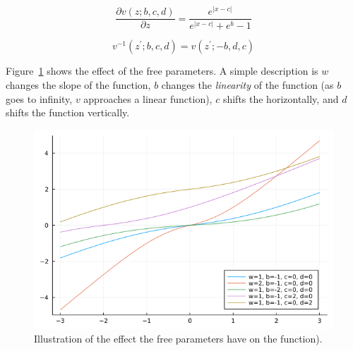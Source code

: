 \documentclass[twoside]{article}
\begin{document}
\begin{equation}
  \frac{\partial v(z; b, c, d)}{\partial z} = \frac{e^{\lvert x - c \rvert}}
  {e^{\lvert x - c \rvert} + e^{b} - 1}
  \label{eq:luddeflow_grad}
\end{equation}

\begin{equation}
  v^{-1}(z^\prime; b, c, d) = v(z^\prime; -b, d, c) \label{eq:luddeflow_inv}
\end{equation}

Figure~\ref{fig:luddeflow} shows the effect of the free parameters. A simple
description is \(w\) changes the slope of the function, \(b\) changes the
\emph{linearity} of the function (as \(b\) goes to infinity, \(v\) approaches a
linear function), \(c\) shifts the horizontally, and \(d\) shifts the function
vertically.

\begin{figure}[ht]
  \vspace{.3in}
  \includegraphics[width=\columnwidth]{luddeflow.png}
  \vspace{.3in}
  \caption{Illustration of the effect the free parameters have on the function).
  }\label{fig:luddeflow}
\end{figure}
\end{document}
